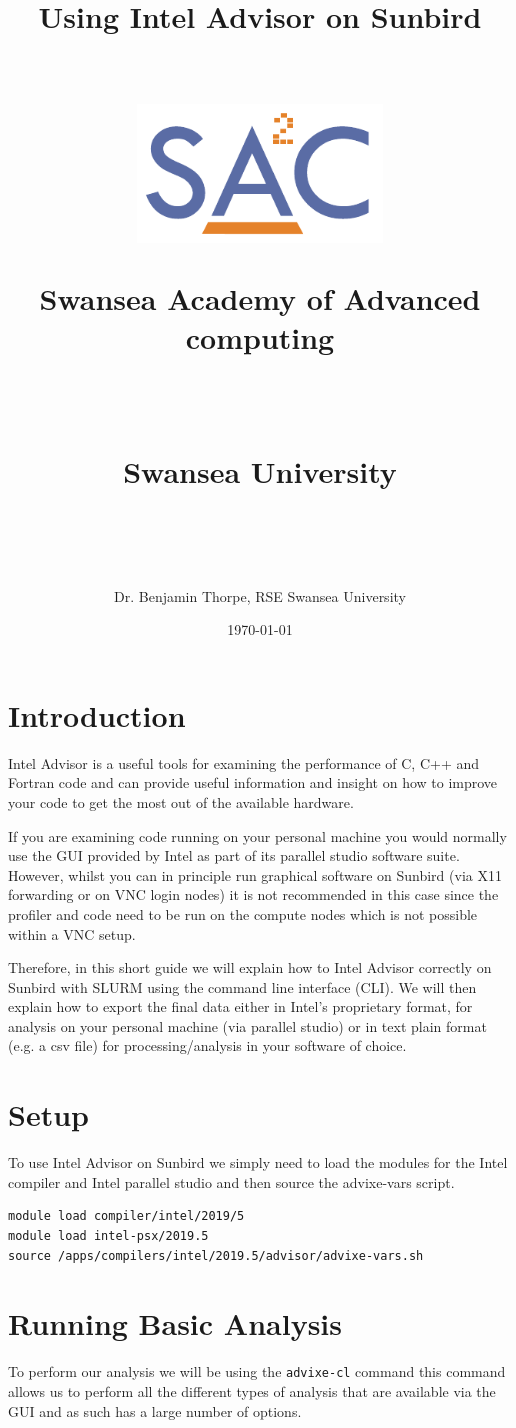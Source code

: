 \documentclass[a4paper, 11pt]{article}
\title{
\begin{Huge}\textbf{Using Intel Advisor on Sunbird} \end{Huge} \\
\includegraphics[width = 65mm]{logos/sa2c.pdf}\\[8ex]
\begin{large} \textbf{Swansea Academy of Advanced computing} \end{large} \\
\normalfont \normalsize
\begin{normalsize} Swansea University \end{normalsize} \\
}
\author{Dr. Benjamin Thorpe, RSE Swansea University} %
\date{\today} %
\begin{document}
\begin{titlepage}
\maketitle
\vfill
\end{titlepage}
\section{Introduction}
Intel Advisor is a useful tools for examining the performance of C, C++ and Fortran code and can provide useful information and insight on how to improve your code to get the most out of the available hardware. 

If you are examining code running on your personal machine you would normally use the GUI provided by Intel as part of its parallel studio software suite. However, whilst you can in principle run graphical software on Sunbird (via X11 forwarding or on VNC login nodes) it is not recommended in this case since the profiler and code need to be run on the compute nodes which is not possible within a VNC setup.

Therefore, in this short guide we will explain how to Intel Advisor correctly on Sunbird with SLURM using the command line interface (CLI). We will then explain how to export the final data either in Intel's proprietary format, for analysis on your personal machine (via parallel studio) or in text plain format (e.g. a csv file) for processing/analysis in your software of choice.
        
\section{Setup}
To use Intel Advisor on Sunbird we simply need to load the modules for the Intel compiler and Intel parallel studio and then source the advixe-vars script.
\begin{verbatim}
module load compiler/intel/2019/5
module load intel-psx/2019.5
source /apps/compilers/intel/2019.5/advisor/advixe-vars.sh
\end{verbatim}
\section{Running Basic Analysis}
To perform our analysis we will be using the \verb+advixe-cl+ command this command allows us to perform all the different types of analysis that are available via the GUI and as such has a large number of options.
\end{document}
